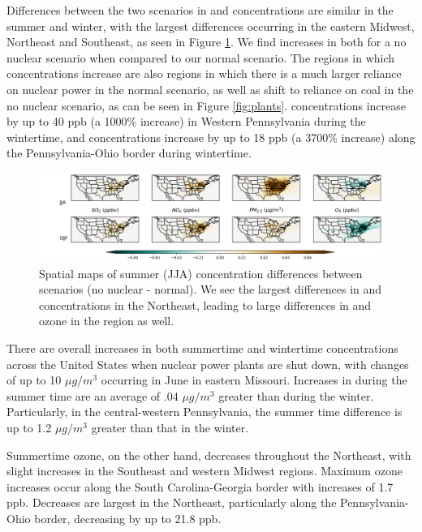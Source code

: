 \documentclass[12]{article}
\begin{document}
Differences between the two scenarios in  and  concentrations are similar in the summer and winter, with the largest differences occurring in the eastern Midwest, Northeast and Southeast, as seen in Figure \ref{fig:summer_winter_dif}. We find increases in both for a no nuclear scenario when compared to our normal scenario. The regions in which concentrations increase are also regions in which there is a much larger reliance on nuclear power in the normal scenario, as well as shift to reliance on coal in the no nuclear scenario, as can be seen in Figure \ref{fig:plants}.  concentrations increase by up to 40 ppb (a 1000\% increase) in Western Pennsylvania during the wintertime, and  concentrations increase by up to 18 ppb (a 3700\% increase) along the Pennsylvania-Ohio border during wintertime. 
\begin{figure}
    \centering
    \includegraphics[scale=0.5]{ego_nonuclear_project/Figures/summer_winter_national_dif.png}
    \caption{Spatial maps of summer (JJA) concentration differences between scenarios (no nuclear - normal). We see the largest differences in  and  concentrations in the Northeast, leading to large differences in  and ozone in the region as well.} 
    \label{fig:summer_winter_dif}
\end{figure}

There are overall increases in both summertime and wintertime  concentrations across the United States when nuclear power plants are shut down, with changes of up to 10 $\mu g/m^3$ occurring in June in eastern Missouri. Increases in  during the summer time are an average of .04 $\mu g/m^3$ greater than during the winter. Particularly, in the central-western Pennsylvania, the summer time  difference is up to 1.2 $\mu g/m^3$ greater than that in the winter. 

Summertime ozone, on the other hand, decreases throughout the Northeast, with slight increases in the Southeast and western Midwest regions. Maximum ozone increases occur along the South Carolina-Georgia border with increases of 1.7 ppb. Decreases are largest in the Northeast, particularly along the Pennsylvania-Ohio border, decreasing by up to 21.8 ppb. 
\end{document}
